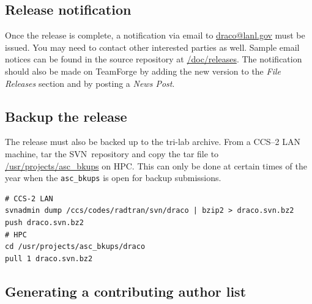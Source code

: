 \documentclass[note]{newmemo}
\newcommand{\svn}{\textsf{SVN}}
\begin{document}

\subsection{Release notification}
\label{sec:release_notification}

Once the release is complete, a notification via email to
\url{draco@lanl.gov} must be issued.  You may need to contact other
interested parties as well.  Sample email notices can be found in the
source repository at \url{/doc/releases}.  The notification should
also be made on TeamForge by adding the new version to the
\textit{File Releases} section and by posting a \textit{News Post}.


\subsection{Backup the release}
\label{sec:backup_rel}


The release must also be backed up to the tri-lab archive.  From a
CCS--2 LAN machine, tar the \svn\ repository and copy the tar file to
\url{/usr/projects/asc\_bkups} on HPC.  This can only be done at
certain times of the year when the \texttt{asc\_bkups} is open for
backup submissions. 
\begin{lstlisting}[basicstyle=\footnotesize, xleftmargin=1.0in, 
  xrightmargin=1.00in]
# CCS-2 LAN
svnadmin dump /ccs/codes/radtran/svn/draco | bzip2 > draco.svn.bz2
push draco.svn.bz2
# HPC
cd /usr/projects/asc_bkups/draco
pull 1 draco.svn.bz2
\end{lstlisting}


\subsection{Generating a contributing author list}
\label{sec:author_list}
\end{document}
